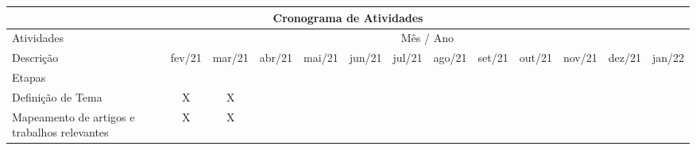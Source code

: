\begin{table}[ht]
    \centering
    \begin{adjustbox}{width=\textwidth}
        \begin{tabular}{|l|l|l|l|l|l|l|l|l|l|l|l|l|}
            \hline
            \multicolumn{13}{|c|}{\cellcolor[HTML]{009901}Cronograma de Atividades}                                                                                                                                                                                                                                                                                                                          \\ \hline
            Atividades                                                                           & \multicolumn{12}{c|}{Mês / Ano}                                                                                                                                                                                                                                                                           \\ \hline
            Descrição                                                                            & fev/21                 & mar/21                 & abr/21                 & mai/21                 & jun/21                 & jul/21                 & ago/21                 & set/21                 & out/21                 & nov/21                 & dez/21                 & jan/22                 \\ \hline
            \multicolumn{13}{|l|}{\cellcolor[HTML]{3531FF}Etapas}                                                                                                                                                                                                                                                                                                                                            \\ \hline
            Definição de Tema                                                                    & \multicolumn{1}{c|}{X} & \multicolumn{1}{c|}{X} &                        &                        &                        &                        &                        &                        &                        &                        &                        &                        \\ \hline
            Mapeamento de artigos e trabalhos relevantes                                         & \multicolumn{1}{c|}{X} & \multicolumn{1}{c|}{X} &                        &                        &                        &                        &                        &                        &                        &                        &                        &                        \\ \hline

\end{tabular}
\end{adjustbox}
\end{table}

